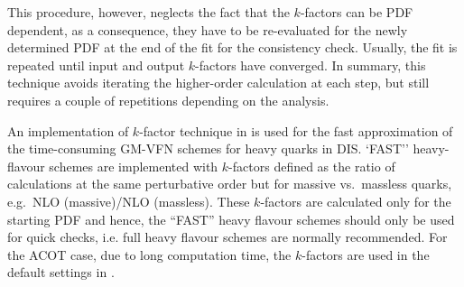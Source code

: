   This procedure, however, neglects the fact that the $k$-factors can be 
  PDF dependent, 
  as a consequence, they have to be re-evaluated
  for the newly determined PDF at the end of the fit for the consistency
  check. Usually, the fit is repeated until input and output
  $k$-factors have converged. In summary, this technique avoids
  iterating the higher-order calculation at each step, but still
  requires a couple of repetitions depending on the analysis.


%
%

An implementation of $k$-factor technique in \fitter is used for the fast 
approximation of the time-consuming GM-VFN schemes for heavy quarks in DIS.
`FAST'' heavy-flavour schemes are implemented
with $k$-factors defined as the ratio of
calculations at the same perturbative order but for massive vs.\
massless quarks, e.g.\ NLO (massive)/NLO (massless).
These $k$-factors are calculated only for the
starting PDF and hence, the ``FAST'' heavy flavour schemes should
only be used for quick checks, i.e. full heavy flavour schemes
are normally recommended. For the ACOT case,
due to long computation time, the $k$-factors are used in 
the default settings in \fitter. 



